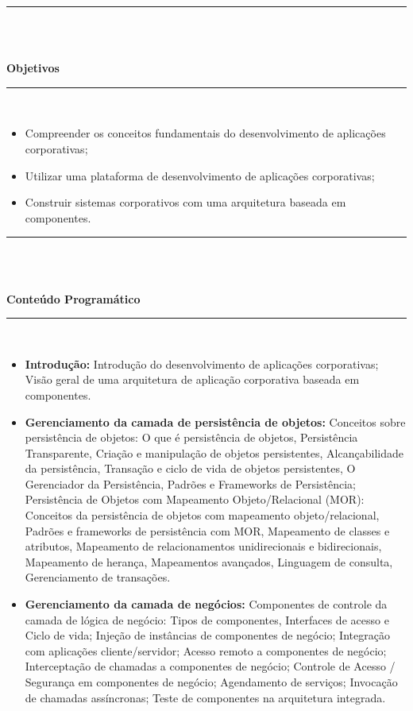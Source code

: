 \noindent\rule{16.5cm}{0.4pt}\\
\\
\vspace{-12mm}
\begin{center}\textbf{Objetivos}\end{center}
\vspace{-5mm}
\noindent\rule{16.5cm}{0.4pt}
\\
\begin{itemize}
\item Compreender os conceitos fundamentais do desenvolvimento de aplicações corporativas;
\item Utilizar uma plataforma de desenvolvimento de aplicações corporativas;
\item Construir sistemas corporativos com uma arquitetura baseada em componentes.\\


\end{itemize}
\noindent\rule{16.5cm}{0.4pt}\\
\\
\vspace{-12mm}
\begin{center}\textbf{Conteúdo Programático}\end{center}
\vspace{-5mm}
\noindent\rule{16.5cm}{0.4pt}
\\
\begin{itemize}
 \item \textbf{Introdução:} Introdução do desenvolvimento de aplicações corporativas;	Visão geral de uma arquitetura de aplicação corporativa baseada em componentes. 
 
 \item \textbf{Gerenciamento da camada de persistência de objetos:} Conceitos sobre persistência de objetos: O que é persistência de objetos, Persistência Transparente, Criação e manipulação de objetos persistentes, Alcançabilidade da persistência, Transação e ciclo de vida de objetos persistentes, O Gerenciador da Persistência, Padrões e Frameworks de Persistência; Persistência de Objetos com Mapeamento Objeto/Relacional (MOR): Conceitos da persistência de objetos com mapeamento objeto/relacional, Padrões e frameworks de persistência com MOR, Mapeamento de classes e atributos, Mapeamento de relacionamentos unidirecionais e bidirecionais, Mapeamento de herança, Mapeamentos avançados, Linguagem de consulta, Gerenciamento de transações.


 \item \textbf{Gerenciamento da camada de negócios:} Componentes de controle da camada de lógica de negócio: Tipos de componentes, Interfaces de acesso e Ciclo de vida; Injeção de instâncias de componentes de negócio; Integração com aplicações cliente/servidor; Acesso remoto a componentes de negócio; Interceptação de chamadas a componentes de negócio; Controle de Acesso / Segurança em componentes de negócio; Agendamento de serviços; Invocação de chamadas assíncronas; Teste de componentes na arquitetura integrada.

 
\end{itemize}
